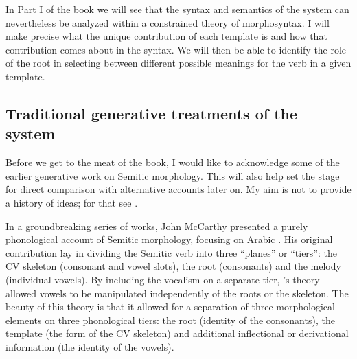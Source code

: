 \begin{exe}
\begin{xlist}
\begin{exe}
\begin{exe}
\begin{exe}
\begin{exe}
\begin{xlist}
\begin{exe}
\begin{xlist}
\begin{xlist}
\begin{xlist}
\begin{exe}
\begin{xlist}
\begin{exe}
\begin{exe}
In Part I of the book we will see that the syntax and semantics of the system can nevertheless be analyzed within a constrained theory of morphosyntax. I will make precise what the unique contribution of each template is and how that contribution comes about in the syntax. We will then be able to identify the role of the root in selecting between different possible meanings for the verb in a given template.


	\subsection{Traditional generative treatments of the system} \label{intro:basic:jjmcc}
Before we get to the meat of the book, I would like to acknowledge some of the earlier generative work on Semitic morphology. This will also help set the stage for direct comparison with alternative accounts later on. My aim is not to provide a history of ideas; for that see \cite{kastnertucker19cup}.

In a groundbreaking series of works, John McCarthy presented a purely phonological account of Semitic morphology, focusing on Arabic \citep{jjmcc79,jjmcc81,jjmcc89li,jjmccprince90}. His original contribution lay in dividing the Semitic verb into three ``planes'' or ``tiers'': the CV skeleton (consonant and vowel slots), the root (consonants) and the melody (individual vowels).
By including the vocalism on a separate tier, \citeauthor{jjmcc81}'s theory allowed vowels to be manipulated independently of the roots or the skeleton.
The beauty of this theory is that it allowed for a separation of three morphological elements on three phonological tiers: the root (identity of the consonants), the template (the form of the CV skeleton) and additional inflectional or derivational information (the identity of the vowels).


\end{exe}
\end{exe}
\end{xlist}
\end{exe}
\end{xlist}
\end{xlist}
\end{xlist}
\end{exe}
\end{xlist}
\end{exe}
\end{exe}
\end{exe}
\end{exe}
\end{xlist}
\end{exe}
